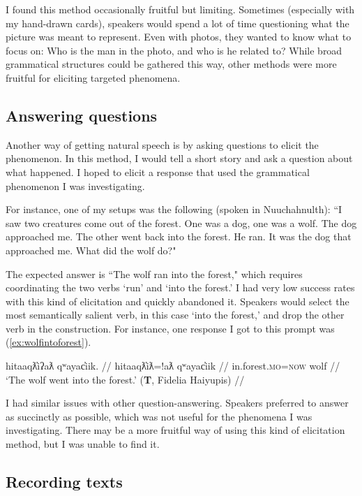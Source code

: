 I found this method occasionally fruitful but limiting. Sometimes (especially with my hand-drawn cards), speakers would spend a lot of time questioning what the picture was meant to represent. Even with photos, they wanted to know what to focus on: Who is the man in the photo, and who is he related to? While broad grammatical structures could be gathered this way, other methods were more fruitful for eliciting targeted phenomena.

\subsection{Answering questions}

Another way of getting natural speech is by asking questions to elicit the phenomenon. In this method, I would tell a short story and ask a question about what happened. I hoped to elicit a response that used the grammatical phenomenon I was investigating.

For instance, one of my setups was the following (spoken in Nuuchahnulth): ``I saw two creatures come out of the forest. One was a dog, one was a wolf. The dog approached me. The other went back into the forest. He ran. It was the dog that approached me. What did the wolf do?"

The expected answer is ``The wolf ran into the forest," which requires coordinating the two verbs `run' and `into the forest.' I had very low success rates with this kind of elicitation and quickly abandoned it. Speakers would select the most semantically salient verb, in this case `into the forest,' and drop the other verb in the construction. For instance, one response I got to this prompt was (\ref{ex:wolfintoforest}).

\ex \label{ex:wolfintoforest}
\begingl
\glpreamble hitaaqƛ̓iʔaƛ qʷayac̓iik. //
\gla hitaaqƛ̓iƛ=!aƛ qʷayac̓iik //
\glb in.forest.\textsc{mo}=\textsc{now} wolf //
\glft `The wolf went into the forest.' (\textbf{T}, Fidelia Haiyupis) //
\endgl
\xe

I had similar issues with other question-answering. Speakers preferred to answer as succinctly as possible, which was not useful for the phenomena I was investigating. There may be a more fruitful way of using this kind of elicitation method, but I was unable to find it.

\subsection{Recording texts}

